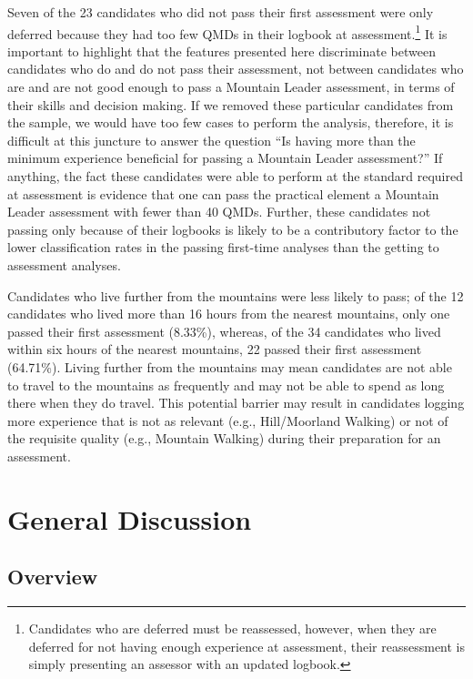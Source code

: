 \documentclass[
  12pt,
  a4paper,
]{book}
\begin{document}
Seven of the 23 candidates who did not pass their first assessment were only deferred because they had too few QMDs in their logbook at assessment.\footnote{Candidates who are deferred must be reassessed, however, when they are deferred for not having enough experience at assessment, their reassessment is simply presenting an assessor with an updated logbook.} It is important to highlight that the features presented here discriminate between candidates who do and do not pass their assessment, not between candidates who are and are not good enough to pass a Mountain Leader assessment, in terms of their skills and decision making. If we removed these particular candidates from the sample, we would have too few cases to perform the analysis, therefore, it is difficult at this juncture to answer the question ``Is having more than the minimum experience beneficial for passing a Mountain Leader assessment?'' If anything, the fact these candidates were able to perform at the standard required at assessment is evidence that one can pass the practical element a Mountain Leader assessment with fewer than 40 QMDs. Further, these candidates not passing only because of their logbooks is likely to be a contributory factor to the lower classification rates in the passing first-time analyses than the getting to assessment analyses.

Candidates who live further from the mountains were less likely to pass; of the 12 candidates who lived more than 16 hours from the nearest mountains, only one passed their first assessment (8.33\%), whereas, of the 34 candidates who lived within six hours of the nearest mountains, 22 passed their first assessment (64.71\%). Living further from the mountains may mean candidates are not able to travel to the mountains as frequently and may not be able to spend as long there when they do travel. This potential barrier may result in candidates logging more experience that is not as relevant (e.g., Hill/Moorland Walking) or not of the requisite quality (e.g., Mountain Walking) during their preparation for an assessment.

\hypertarget{pra-gen-discussion}{%
\section{General Discussion}\label{pra-gen-discussion}}

\hypertarget{overview}{%
\subsection{Overview}\label{overview}}
\end{document}
